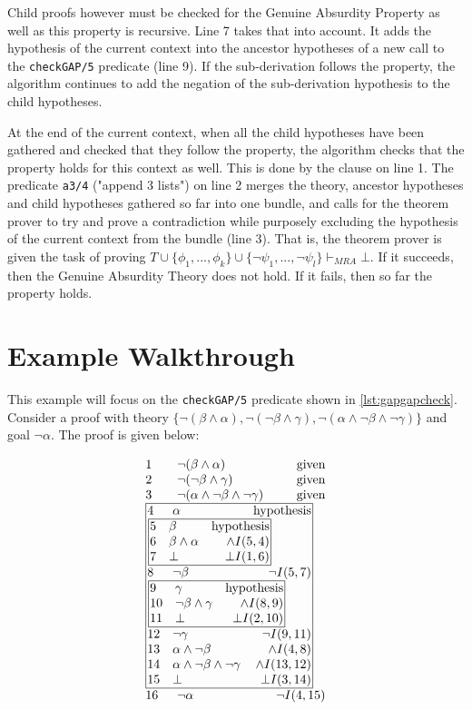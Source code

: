 \documentclass[11pt,twoside,a4paper]{report}
\begin{document}
Child proofs however must be checked for the Genuine Absurdity Property as well as this property is recursive. Line 7 takes that into account. It adds the hypothesis of the current context into the ancestor hypotheses of a new call to the \lstinline$checkGAP/5$ predicate (line 9). If the sub-derivation follows the property, the algorithm continues to add the negation of the sub-derivation hypothesis to the child hypotheses. 

At the end of the current context, when all the child hypotheses have been gathered and checked that they follow the property, the algorithm checks that the property holds for this context as well. This is done by the clause on line 1. The predicate \lstinline$a3/4$ ("append 3 lists") on line 2 merges the theory, ancestor hypotheses and child hypotheses gathered so far into one bundle, and calls for the theorem prover to try and prove a contradiction while purposely excluding the hypothesis of the current context from the bundle (line 3). That is, the theorem prover is given the task of proving $T\cup\{\phi_1, ..., \phi_k\}\cup\{\neg\psi_1, ..., \neg\psi_l\}\vdash_{MRA}\bot$. If it succeeds, then the Genuine Absurdity Theory does not hold. If it fails, then so far the property holds.

\section{Example Walkthrough}
This example will focus on the \lstinline$checkGAP/5$ predicate shown in \autoref{lst:gapgapcheck}. Consider a proof with theory $\{\neg(\beta\wedge\alpha), \neg(\neg\beta\wedge\gamma), \neg(\alpha\wedge\neg\beta\wedge\neg\gamma)\}$ and goal $\neg\alpha$. The proof is given below: 

\[\vbox{\offinterlineskip\halign{
&\tabskip=1.5em#\strut&$#$\hfil\tabskip=1em&\hfil$#$\tabskip=0em\cr
%
1&\neg(\beta\wedge\alpha)&\mbox{given}\cr
2&\neg(\neg\beta\wedge\gamma)&\mbox{given}\cr
3&\neg(\alpha\wedge\neg\beta\wedge\neg\gamma)&\mbox{given}\cr
%
\multispan3\vbox{\halign{
\vrule#&&\hskip.1em\tabskip=1em#\strut&$#$\hfil\tabskip=1em&\hfil$#$\hskip0.1em\tabskip=0em&\vrule#\cr
\noalign{\hrule}
%
&4&\alpha&\mbox{hypothesis}&\cr
%
&\multispan3\,\vbox{\halign{
\vrule#&&\hskip.1em\tabskip=1em#\strut&$#$\hfil\tabskip=1em&\hfil$#$\hskip0.1em\tabskip=0em&\vrule#\cr
\noalign{\hrule}
%
&5&\beta&\mbox{hypothesis}&\cr
&6&\beta\wedge\alpha&\wedge I(5,4)&\cr
&7&\bot&\bot I(1,6)&\cr
%
\noalign{\hrule}}}\,&\cr
%
&8&\neg\beta&\neg I(5,7)&\cr
%
&\multispan3\,\vbox{\halign{
\vrule#&&\hskip.1em\tabskip=1em#\strut&$#$\hfil\tabskip=1em&\hfil$#$\hskip0.1em\tabskip=0em&\vrule#\cr
\noalign{\hrule}
%
&9&\gamma&\mbox{hypothesis}&\cr
&10&\neg\beta\wedge\gamma&\wedge I(8,9)&\cr
&11&\bot&\bot I(2,10)&\cr
%
\noalign{\hrule}}}\,&\cr
%
&12&\neg\gamma&\neg I(9,11)&\cr
&13&\alpha\wedge\neg\beta&\wedge I(4,8)&\cr
&14&\alpha\wedge\neg\beta\wedge\neg\gamma&\wedge I(13,12)&\cr
&15&\bot&\bot I(3,14)&\cr
%
\noalign{\hrule}}}\,\cr
%
16&\neg\alpha&\neg I(4,15)\cr
}}\]
\end{document}
